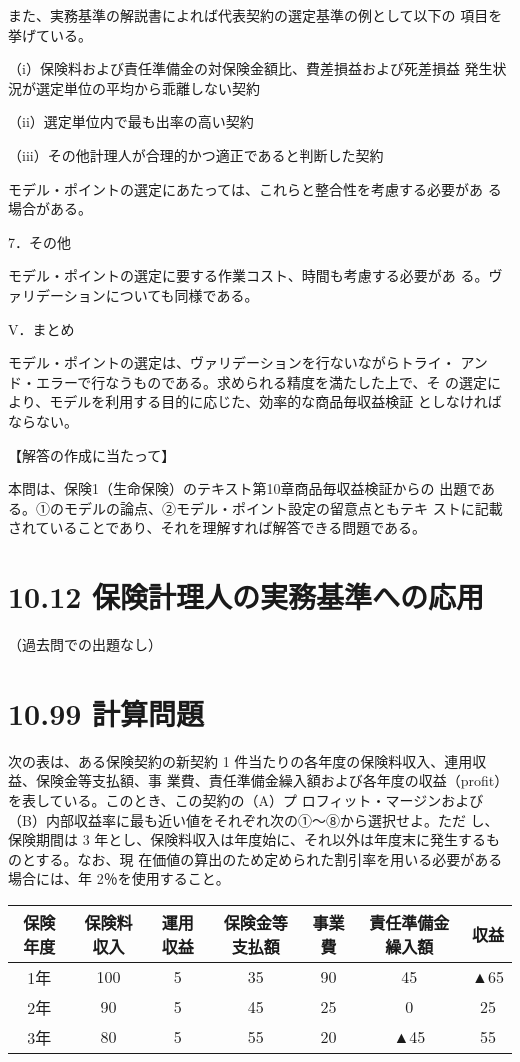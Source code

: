 \documentclass[report,gutter=10mm,fore-edge=10mm,uplatex,dvipdfmx]{jlreq}
\begin{document}
また、実務基準の解説書によれば代表契約の選定基準の例として以下の
項目を挙げている。

（i）保険料および責任準備金の対保険金額比、費差損益および死差損益
発生状況が選定単位の平均から乖離しない契約

（ii）選定単位内で最も出率の高い契約

（iii）その他計理人が合理的かつ適正であると判断した契約

モデル・ポイントの選定にあたっては、これらと整合性を考慮する必要があ
る場合がある。

7．その他

モデル・ポイントの選定に要する作業コスト、時間も考慮する必要があ
る。ヴァリデーションについても同様である。

V．まとめ

モデル・ポイントの選定は、ヴァリデーションを行ないながらトライ・
アンド・エラーで行なうものである。求められる精度を満たした上で、そ
の選定により、モデルを利用する目的に応じた、効率的な商品毎収益検証
としなければならない。

【解答の作成に当たって】

本問は、保険1（生命保険）のテキスト第10章商品毎収益検証からの
出題である。①のモデルの論点、②モデル・ポイント設定の留意点ともテキ
ストに記載されていることであり、それを理解すれば解答できる問題である。

\section{10.12 保険計理人の実務基準への応用}
（過去問での出題なし）

\section{10.99 計算問題}
次の表は、ある保険契約の新契約 1 件当たりの各年度の保険料収入、連用収益、保険金等支払額、事
業費、責任準備金繰入額および各年度の収益（profit）を表している。このとき、この契約の（A）プ
ロフィット・マージンおよび（B）内部収益率に最も近い値をそれぞれ次の①～⑧から選択せよ。ただ
し、保険期間は 3 年とし、保険料収入は年度始に、それ以外は年度末に発生するものとする。なお、現
在価値の算出のため定められた割引率を用いる必要がある場合には、年 2％を使用すること。

\begin{tabular}{|c|c|c|c|c|c|c|}
\hline
 保険年度&保険料収入& 運用収益&保険金等支払額&事業費&責任準備金繰入額&収益\\ \hline
 1年& 100&5 &35 &90 &45&▲65 \\ \hline
 2年& 90&5 &45 &25& 0&25 \\ \hline
 3年& 80&5 &55 &20&▲45&55 \\ \hline
\end{tabular}
\end{document}
